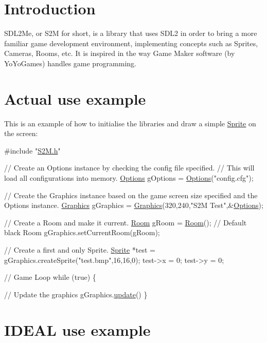 \hypertarget{index_intro_sec}{}\section{Introduction}\label{index_intro_sec}
S\-D\-L2\-Me, or S2\-M for short, is a library that uses S\-D\-L2 in order to bring a more familiar game development environment, implementing concepts such as Sprites, Cameras, Rooms, etc. It is inspired in the way Game Maker software (by Yo\-Yo\-Games) handles game programming.\hypertarget{index_actual_use_sec}{}\section{Actual use example}\label{index_actual_use_sec}
This is an example of how to initialise the libraries and draw a simple \hyperlink{class_sprite}{Sprite} on the screen\-: 
\begin{DoxyCode}
\textcolor{preprocessor}{#include "\hyperlink{_s2_m_8h}{S2M.h}"}

\textcolor{comment}{// Create an Options instance by checking the config file specified.}
\textcolor{comment}{// This will load all configurations into memory.}
\hyperlink{class_options}{Options} gOptions = \hyperlink{class_options}{Options}(\textcolor{stringliteral}{"config.cfg"});

\textcolor{comment}{// Create the Graphics instance based on the game screen size specified and the Options instance.}
\hyperlink{class_graphics}{Graphics} gGraphics = \hyperlink{class_graphics}{Graphics}(320,240,\textcolor{stringliteral}{"S2M Test"},&\hyperlink{class_options}{Options});

\textcolor{comment}{// Create a Room and make it current.}
\hyperlink{class_room}{Room} gRoom = \hyperlink{class_room}{Room}(); \textcolor{comment}{// Default black Room}
gGraphics.setCurrentRoom(gRoom);

\textcolor{comment}{// Create a first and only Sprite.}
\hyperlink{class_sprite}{Sprite} *test = gGraphics.createSprite(\textcolor{stringliteral}{"test.bmp"},16,16,0);
test->x = 0;
test->y = 0;

\textcolor{comment}{// Game Loop}
\textcolor{keywordflow}{while} (\textcolor{keyword}{true}) \{

    \textcolor{comment}{// Update the graphics}
    gGraphics.\hyperlink{class_graphics_a5a5297a160c22f73300dcf72ac0be7c2}{update}()
\}
\end{DoxyCode}
 \hypertarget{index_ideal_use_sec}{}\section{I\-D\-E\-A\-L use example}\label{index_ideal_use_sec}
